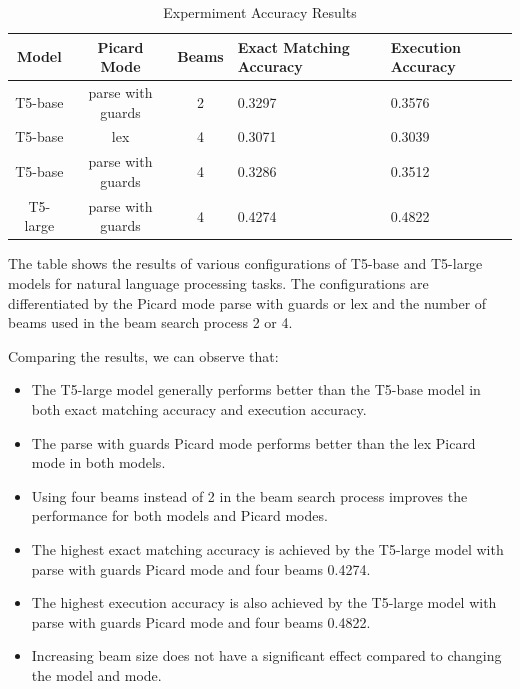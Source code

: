 \begin{table}[!ht]
    \centering
    \begin{tabular}{|c|c|c|L|L|}
        \hline
        Model    & Picard Mode       & Beams & \textbf{Exact Matching Accuracy} & \textbf{Execution Accuracy} \\ \hline
        T5-base  & parse with guards & 2     & 0.3297                           & 0.3576                      \\ \hline
        T5-base  & lex               & 4     & 0.3071                           & 0.3039                      \\ \hline
        T5-base  & parse with guards & 4     & 0.3286                           & 0.3512                      \\ \hline
        T5-large & parse with guards & 4     & 0.4274                           & 0.4822                      \\ \hline
    \end{tabular}
    \caption{Expermiment Accuracy Results}
\end{table}

The table shows the results of various configurations of T5-base and T5-large models for natural language processing tasks. The configurations are differentiated by the Picard mode parse with guards or lex and the number of beams used in the beam search process 2 or 4.

Comparing the results, we can observe that:
\begin{itemize}
    \item The T5-large model generally performs better than the T5-base model in both exact matching accuracy and execution accuracy.
    \item The parse with guards Picard mode performs better than the lex Picard mode in both models.
    \item Using four beams instead of 2 in the beam search process improves the performance for both models and Picard modes.
    \item The highest exact matching accuracy is achieved by the T5-large model with parse with guards Picard mode and four beams 0.4274.
    \item The highest execution accuracy is also achieved by the T5-large model with parse with guards Picard mode and four beams 0.4822.
    \item Increasing beam size does not have a significant effect compared to changing the model and mode.
\end{itemize}


